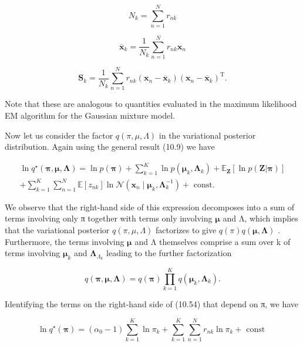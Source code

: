 \documentclass[
  10
]{article}
\begin{document}
\[
N _ {k} = \sum_ {n = 1} ^ {N} r _ {n k}\tag{10.51}
\]

\[
{\overline {{\mathbf {x}}} _ {k}} = {\frac {1}{N _ {k}} \sum_ {n = 1} ^ {N} r _ {n k} \mathbf {x} _ {n}}\tag{10.52}
\]

\[
\mathbf {S} _ {k} = \frac {1}{N _ {k}} \sum_ {n = 1} ^ {N} r _ {n k} (\mathbf {x} _ {n} - \overline {{\mathbf {x}}} _ {k}) (\mathbf {x} _ {n} - \overline {{\mathbf {x}}} _ {k}) ^ {\mathrm{T}}.\tag{10.53}
\]

Note that these are analogous to quantities evaluated in the maximum
likelihood EM algorithm for the Gaussian mixture model.

Now let us consider the factor \(q ( \pi , \mu , \Lambda )\) in the
variational posterior distribution. Again using the general result
(10.9) we have

\[
\begin{array}{l} \ln q ^ {\star} (\boldsymbol {\pi}, \boldsymbol {\mu}, \boldsymbol {\Lambda}) = \ln p (\boldsymbol {\pi}) + \sum_ {k = 1} ^ {K} \ln p \left(\boldsymbol {\mu} _ {k}, \boldsymbol {\Lambda} _ {k}\right) + \mathbb {E} _ {\mathbf {Z}} [ \ln p (\mathbf {Z} | \boldsymbol {\pi}) ] \\ + \sum_ {k = 1} ^ {K} \sum_ {n = 1} ^ {N} \mathbb {E} \left[ z _ {n k} \right] \ln \mathcal {N} \left(\mathbf {x} _ {n} \mid \boldsymbol {\mu} _ {k}, \boldsymbol {\Lambda} _ {k} ^ {- 1}\right) + \text { const. } \end{array} \tag {10}\tag{10.54}
\]

We observe that the right-hand side of this expression decomposes into a
sum of terms involving only π together with terms only involving
\(\pmb { \mu }\) and Λ, which implies that the variational posterior
\(q ( \pi , \mu , \Lambda )\) factorizes to give
\(q ( \pi ) q ( \pmb { \mu } , \pmb { \Lambda } )\) . Furthermore, the
terms involving \(\pmb { \mu }\) and Λ themselves comprise a sum over k
of terms involving \(\pmb { \mu } _ { k }\) and
\(\mathbf { \Lambda } _ { \Lambda _ { k } }\) leading to the further
factorization

\[
q (\boldsymbol {\pi}, \boldsymbol {\mu}, \boldsymbol {\Lambda}) = q (\boldsymbol {\pi}) \prod_ {k = 1} ^ {K} q (\boldsymbol {\mu} _ {k}, \boldsymbol {\Lambda} _ {k}).\tag{10.55}
\]

Identifying the terms on the right-hand side of (10.54) that depend on
π, we have

\[
\ln q ^ {\star} (\boldsymbol {\pi}) = (\alpha_ {0} - 1) \sum_ {k = 1} ^ {K} \ln \pi_ {k} + \sum_ {k = 1} ^ {K} \sum_ {n = 1} ^ {N} r _ {n k} \ln \pi_ {k} + \text { const }\tag{10.56}
\]
\end{document}
